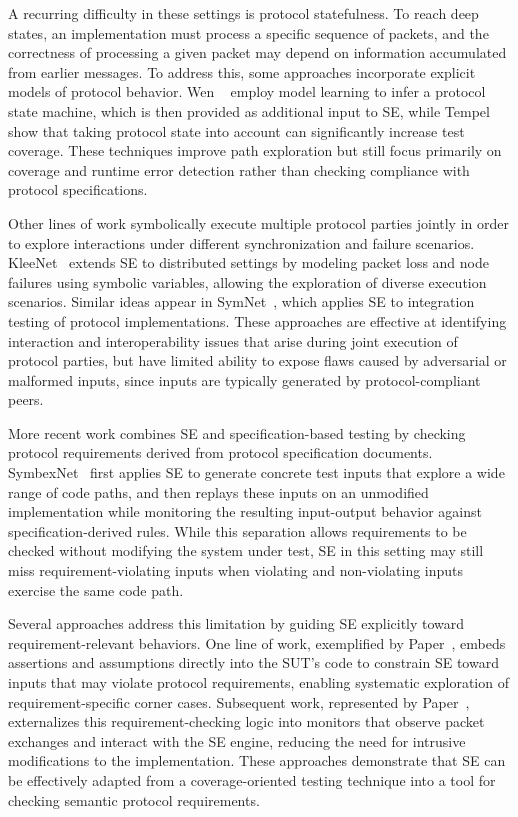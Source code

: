 A recurring difficulty in these settings is protocol statefulness.
To reach deep states, an implementation must process a specific sequence of packets, and the correctness of processing a given packet may depend on information accumulated from earlier messages.
To address this, some approaches incorporate explicit models of protocol behavior.
Wen \etal~\cite{wen2017model} employ model learning to infer a protocol state machine, which is then provided as additional input to SE, while Tempel \etal~\cite{tempel2023specification} show that taking protocol state into account can significantly increase test coverage.
These techniques improve path exploration but still focus primarily on coverage and runtime error detection rather than checking compliance with protocol specifications.

Other lines of work symbolically execute multiple protocol parties jointly in order to explore interactions under different synchronization and failure scenarios.
KleeNet~\cite{KleeNet,KleeNet-poster} extends SE to distributed settings by modeling packet loss and node failures using symbolic variables, allowing the exploration of diverse execution scenarios.
Similar ideas appear in SymNet~\cite{Symnet}, which applies SE to integration testing of protocol implementations.
These approaches are effective at identifying interaction and interoperability issues that arise during joint execution of protocol parties, but have limited ability to expose flaws caused by adversarial or malformed inputs, since inputs are typically generated by protocol-compliant peers.

More recent work combines SE and specification-based testing by checking protocol requirements derived from protocol specification documents.
SymbexNet~\cite{SymbexNet} first applies SE to generate concrete test inputs that explore a wide range of code paths, and then replays these inputs on an unmodified implementation while monitoring the resulting input-output behavior against specification-derived rules.
While this separation allows requirements to be checked without modifying the system under test, SE in this setting may still miss requirement-violating inputs when violating and non-violating inputs exercise the same code path.

Several approaches address this limitation by guiding SE explicitly toward requirement-relevant behaviors.
One line of work, exemplified by Paper~, embeds assertions and assumptions directly into the SUT's code to constrain SE toward inputs that may violate protocol requirements, enabling systematic exploration of requirement-specific corner cases.
Subsequent work, represented by Paper~, externalizes this requirement-checking logic into monitors that observe packet exchanges and interact with the SE engine, reducing the need for intrusive modifications to the implementation.
These approaches demonstrate that SE can be effectively adapted from a coverage-oriented testing technique into a tool for checking semantic protocol requirements.


